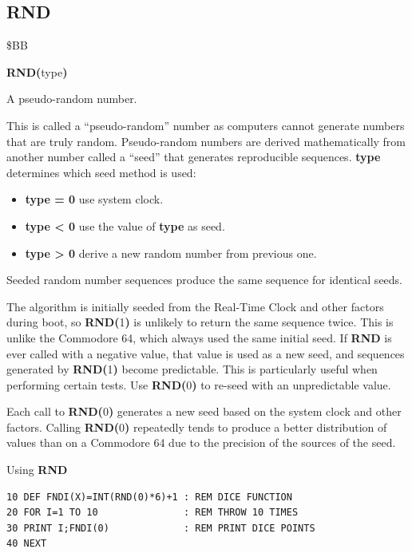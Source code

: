 
\newpage
\subsection{RND}
\begin{description}[leftmargin=2cm,style=nextline]
\item [Token:]    \$BB

\item [Format:]   {\bf RND(}type{\bf)}

\item [Returns:]  A pseudo-random number.

                  This is called a ``pseudo-random'' number as computers cannot generate numbers that are truly random. Pseudo-random numbers are derived mathematically from another number called a ``seed'' that generates reproducible sequences. {\bf type} determines which seed method is used:

                  \begin{itemize}
                     \item {\bf type = 0} use system clock.
                     \item {\bf type < 0} use the value of {\bf type} as seed.
                     \item {\bf type > 0} derive a new random number from previous one.
                  \end{itemize}

\item [Remarks:]  Seeded random number sequences produce the same sequence for identical seeds.

                  The algorithm is initially seeded from the Real-Time Clock and other factors during boot, so {\bf RND(}1{\bf)} is unlikely to return the same sequence twice. This is unlike the Commodore 64, which always used the same initial seed. If {\bf RND} is ever called with a negative value, that value is used as a new seed, and sequences generated by {\bf RND(}1{\bf)} become predictable. This is particularly useful when performing certain tests. Use {\bf RND(}0{\bf)} to re-seed with an unpredictable value.

                  Each call to {\bf RND(}0{\bf)} generates a new seed based on the system clock and other factors. Calling {\bf RND(}0{\bf)} repeatedly tends to produce a better distribution of values than on a Commodore 64 due to the precision of the sources of the seed.

\item [Example:]  Using {\bf RND}

\begin{tcolorbox}[colback=black,coltext=white]
\verbatimfont{\codefont}
\begin{verbatim}
10 DEF FNDI(X)=INT(RND(0)*6)+1 : REM DICE FUNCTION
20 FOR I=1 TO 10               : REM THROW 10 TIMES
30 PRINT I;FNDI(0)             : REM PRINT DICE POINTS
40 NEXT
\end{verbatim}
\end{tcolorbox}
\end{description}

